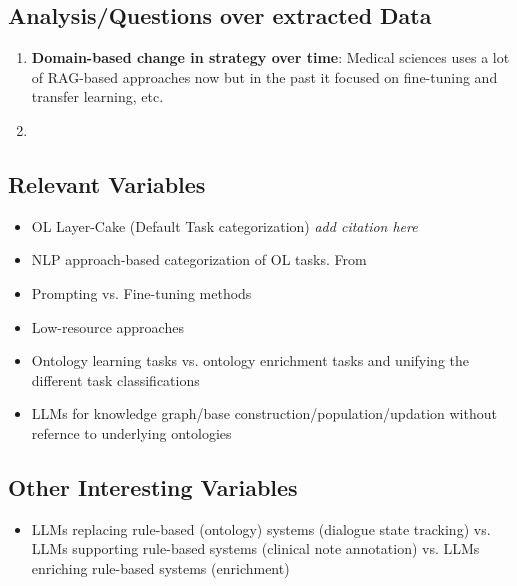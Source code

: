 \documentclass[a4paper,colorinlistoftodos]{article}
\begin{document}
\subsection{Analysis/Questions over extracted Data}
\label{subsec:analysis-over-data}
\begin{enumerate}
  \item \textbf{Domain-based change in strategy over time}: Medical sciences
    uses a lot of RAG-based approaches now but in the past it focused on
    fine-tuning and transfer learning, etc.
  \item 
\end{enumerate}
  
  

\subsection{Relevant Variables}
\label{subsec:relevant-variables}

\begin{itemize}
\item OL Layer-Cake (Default Task categorization) \textit{add citation here}
\item NLP approach-based categorization of OL tasks.
  From \cite{du2024ShortReviewOntology}
\item Prompting vs. Fine-tuning methods
\item Low-resource approaches
\item Ontology learning tasks vs. ontology enrichment tasks and unifying the
  different task classifications
\item LLMs for knowledge graph/base construction/population/updation without
  refernce to underlying ontologies
\end{itemize}

\subsection{Other Interesting Variables}
\label{subsec:other-variables}

\begin{itemize}
  \item LLMs replacing rule-based (ontology) systems (dialogue state tracking)
    vs. LLMs supporting rule-based systems (clinical note annotation) vs. LLMs
    enriching rule-based systems (enrichment)
  \end{itemize}





\end{document}
